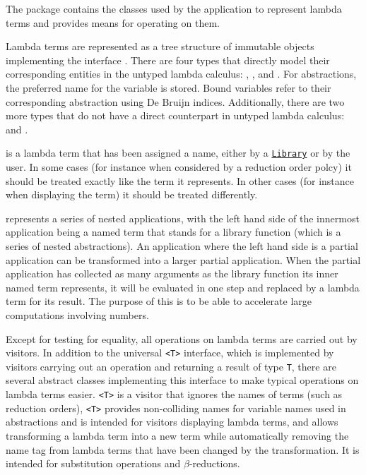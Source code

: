 The \texttt{} package contains the classes used by the application to
represent lambda terms and provides means for operating on them.

Lambda terms are represented as a tree structure of immutable objects
implementing the interface \texttt{}. There are four types that
directly model their corresponding entities in the untyped lambda calculus:
\texttt{}, \texttt{}, \texttt{} and
\texttt{}. For abstractions, the preferred name for the variable is stored.
Bound variables refer to their corresponding abstraction using De Bruijn indices.
Additionally, there are two more types that do not have
a direct counterpart in untyped lambda calculus: \texttt{} and
\texttt{}.

\texttt{} is a lambda term that has been assigned a name, either by a
\texttt{\hyperref[type:edu.kit.wavelength.client.model.libraray.Library]{Library}} or 
by the user. In some cases (for instance when considered by a
reduction order polcy) it should be treated exactly like the term it
represents. In other cases (for instance when displaying the term) it should be
treated differently.

\texttt{} represents a series of nested applications, with
the left hand side of the innermost application being a named term that stands
for a library function (which is a series of nested abstractions). An
application where the left hand side is a partial application can be
transformed into a larger partial application. When the partial application
has collected as many arguments as the library function its inner named
term represents, it will be evaluated in one step and replaced by a lambda
term for its result. The purpose of this is to be able to accelerate large
computations involving numbers.

Except for testing for equality, all operations on lambda terms are carried out
by visitors. In addition to the universal \texttt{<T>} interface, which
is implemented by visitors carrying out an operation and returning a result of type
\texttt{T}, there are several abstract classes implementing this interface to make
typical operations on lambda terms easier. \texttt{<T>} is a
visitor that ignores the names of terms (such as reduction orders),
\texttt{<T>} provides non-colliding names for variable names
used in abstractions and is intended for visitors displaying lambda terms, and
\texttt{} allows transforming a lambda term into a new term while
automatically removing the name tag from lambda terms that have been changed by
the transformation. It is intended for substitution operations and $\beta$-reductions.

